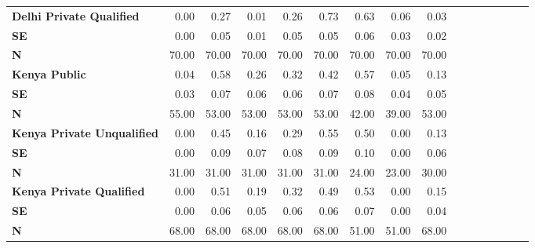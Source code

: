 \begin{tabular}{@{\extracolsep{5pt}}lrrrrrrrrrrrrrrr}
{\bf Delhi Private Qualified} & 0.00\phantom{***} & 0.27\phantom{***} & 0.01\phantom{***} & 0.26\phantom{***} & 0.73\phantom{***} & 0.63\phantom{***} & 0.06\phantom{***} & 0.03\phantom{***} \\
{\bf SE} & 0.00\phantom{***} & 0.05\phantom{***} & 0.01\phantom{***} & 0.05\phantom{***} & 0.05\phantom{***} & 0.06\phantom{***} & 0.03\phantom{***} & 0.02\phantom{***} \\
{\bf N} & 70.00\phantom{***} & 70.00\phantom{***} & 70.00\phantom{***} & 70.00\phantom{***} & 70.00\phantom{***} & 70.00\phantom{***} & 70.00\phantom{***} & 70.00\phantom{***} \\
{\bf Kenya Public} & 0.04\phantom{***} & 0.58\phantom{***} & 0.26\phantom{***} & 0.32\phantom{***} & 0.42\phantom{***} & 0.57\phantom{***} & 0.05\phantom{***} & 0.13\phantom{***} \\
{\bf SE} & 0.03\phantom{***} & 0.07\phantom{***} & 0.06\phantom{***} & 0.06\phantom{***} & 0.07\phantom{***} & 0.08\phantom{***} & 0.04\phantom{***} & 0.05\phantom{***} \\
{\bf N} & 55.00\phantom{***} & 53.00\phantom{***} & 53.00\phantom{***} & 53.00\phantom{***} & 53.00\phantom{***} & 42.00\phantom{***} & 39.00\phantom{***} & 53.00\phantom{***} \\
{\bf Kenya Private Unqualified} & 0.00\phantom{***} & 0.45\phantom{***} & 0.16\phantom{***} & 0.29\phantom{***} & 0.55\phantom{***} & 0.50\phantom{***} & 0.00\phantom{***} & 0.13\phantom{***} \\
{\bf SE} & 0.00\phantom{***} & 0.09\phantom{***} & 0.07\phantom{***} & 0.08\phantom{***} & 0.09\phantom{***} & 0.10\phantom{***} & 0.00\phantom{***} & 0.06\phantom{***} \\
{\bf N} & 31.00\phantom{***} & 31.00\phantom{***} & 31.00\phantom{***} & 31.00\phantom{***} & 31.00\phantom{***} & 24.00\phantom{***} & 23.00\phantom{***} & 30.00\phantom{***} \\
{\bf Kenya Private Qualified} & 0.00\phantom{***} & 0.51\phantom{***} & 0.19\phantom{***} & 0.32\phantom{***} & 0.49\phantom{***} & 0.53\phantom{***} & 0.00\phantom{***} & 0.15\phantom{***} \\
{\bf SE} & 0.00\phantom{***} & 0.06\phantom{***} & 0.05\phantom{***} & 0.06\phantom{***} & 0.06\phantom{***} & 0.07\phantom{***} & 0.00\phantom{***} & 0.04\phantom{***} \\
{\bf N} & 68.00\phantom{***} & 68.00\phantom{***} & 68.00\phantom{***} & 68.00\phantom{***} & 68.00\phantom{***} & 51.00\phantom{***} & 51.00\phantom{***} & 68.00\phantom{***} \\

\end{tabular}
